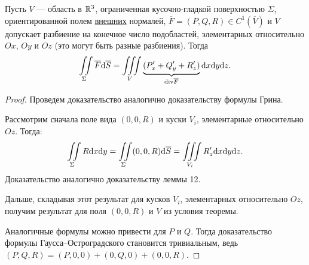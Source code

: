 \begin{Theorem}
Пусть $V$ --- область в $\mathbb{R}^3$, ограниченная кусочно-гладкой поверхностью $\Sigma$, ориентированной полем \underline{внешних} нормалей, $\overline F = (P, Q, R) \in C^1(\overline V)$ и $V$ допускает разбиение на конечное число подобластей, элементарных относительно $Ox$, $Oy$ и $Oz$ (это могут быть разные разбиения). Тогда
$$
\iint\limits_{\Sigma}\overline F \mathrm{d} \overline S = \iiint\limits_V \underbrace{(P'_x + Q'_y + R'_z)}_{\mathrm{div} \overline F}\mathrm{d}x \mathrm{d} y \mathrm{d} z.
$$
\end{Theorem}
\begin{proof}
Проведем доказательство аналогично доказательству формулы Грина.

Рассмотрим сначала поле вида $(0, 0, R)$ и куски $V_i$, элементарные относительно $Oz$. Тогда:
$$
\iint\limits_{\Sigma} R\mathrm{d}x\mathrm{d} y = \iint\limits_{\Sigma} (0, 0, R)\mathrm{d} \overline S = \iiint\limits_{V_i} R'_z \mathrm{d} x \mathrm{d} y \mathrm{d} z. 
$$
Доказательство аналогично доказательству леммы 12.

Дальше, складывая этот результат для кусков $V_i$, элементарных относительно $Oz$, получим результат для поля $(0, 0, R)$ и $V$ из условия теоремы.

Аналогичные формулы можно привести для $P$ и $Q$. Тогда доказательство формулы Гаусса--Остроградского становится тривиальным, ведь $(P, Q, R) = (P, 0, 0) + (0, Q, 0) + (0, 0, R)$.
\end{proof}

